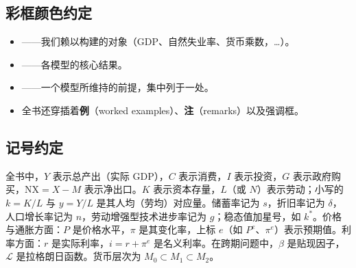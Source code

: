 \documentclass[oneside,fontset=macnew,UTF8]{ctexbook}
\begin{document}
\subsection*{彩框颜色约定}

\begin{itemize}
    \item {}——我们赖以构建的对象（GDP、自然失业率、货币乘数，\dots）。
    \item {}——各模型的核心结果。
    \item {}——一个模型所维持的前提，集中列于一处。
    \item 全书还穿插着\textbf{例}（worked examples）、\textbf{注}（remarks）以及强调框。
\end{itemize}

\subsection*{记号约定}

全书中，$Y$ 表示总产出（实际 GDP），$C$ 表示消费，$I$ 表示投资，$G$ 表示政府购买，$\mathrm{NX}=X-M$ 表示净出口。$K$ 表示资本存量，$L$（或 $N$）表示劳动；小写的 $k=K/L$ 与 $y=Y/L$ 是其人均（劳均）对应量。储蓄率记为 $s$，折旧率记为 $\delta$，人口增长率记为 $n$，劳动增强型技术进步率记为 $g$；稳态值加星号，如 $k^{*}$。价格与通胀方面：$P$ 是价格水平，$\pi$ 是其变化率，上标 $e$（如 $P^{e}$、$\pi^{e}$）表示预期值。利率方面：$r$ 是实际利率，$i=r+\pi^{e}$ 是名义利率。在跨期问题中，$\beta$ 是贴现因子，$\mathcal{L}$ 是拉格朗日函数。货币层次为 $M_0\subset M_1\subset M_2$。

\newpage

\setcounter{tocdepth}{1}
\tableofcontents
\newpage















\end{document}
